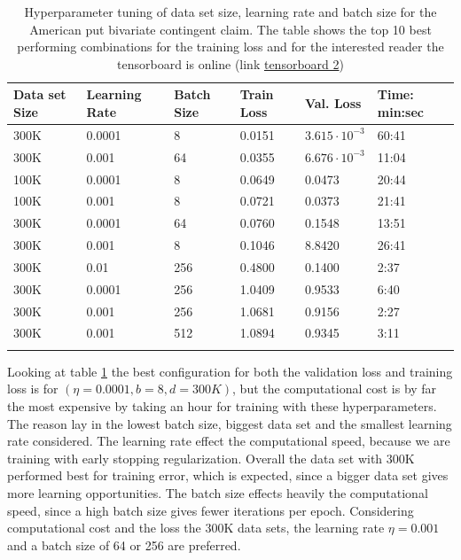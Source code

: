 \begin{table}[th]
\caption{Hyperparameter tuning of data set size, learning rate and batch size for the American put bivariate contingent claim. The table shows the top 10 best performing combinations for the training loss and for the interested reader the tensorboard is online (link \href{https://tensorboard.dev/experiment/mQWtOskJRoWrmrFgOIVQ4g/}{tensorboard 2})}
\label{tab:hyperAmerMin1}
\centering
\begin{tabular}{llllll}
\toprule
\textbf{Data set Size} & \textbf{Learning Rate} & \textbf{Batch Size} & \textbf{Train Loss} & \textbf{Val. Loss} & \textbf{Time: min:sec} \\
\midrule
300K    & 0.0001 & 8     & 0.0151 & $3.615\cdot 10^{-3}$ & 60:41\\ 
300K    & 0.001  & 64    & 0.0355 & $6.676\cdot 10^{-3}$ & 11:04\\ 
100K    & 0.0001 & 8     & 0.0649 & 0.0473 & 20:44\\ 
100K    & 0.001  & 8     & 0.0721 & 0.0373 & 21:41\\ 
300K    & 0.0001 & 64    & 0.0760 & 0.1548 & 13:51\\ 
300K    & 0.001  & 8     & 0.1046 & 8.8420 & 26:41\\ 
300K    & 0.01   & 256   & 0.4800 & 0.1400 & 2:37\\ 
300K    & 0.0001 & 256   & 1.0409 & 0.9533 & 6:40\\ 
300K    & 0.001  & 256   & 1.0681 & 0.9156 & 2:27 \\ 
300K    & 0.001  & 512   & 1.0894 & 0.9345 & 3:11 \\ 
\bottomrule\\
\end{tabular}
\end{table}

Looking at table \ref{tab:hyperAmerMin1} the best configuration for both the validation loss and training loss is for $(\eta=0.0001, b=8, d=300K)$, but the computational cost is by far the most expensive by taking an hour for training with these hyperparameters. The reason lay in the lowest batch size, biggest data set and the smallest learning rate considered. The learning rate effect the computational speed, because we are training with early stopping regularization. Overall the data set with 300K performed best for training error, which is expected, since a bigger data set gives more learning opportunities. The batch size effects heavily the computational speed, since a high batch size gives fewer iterations per epoch. Considering computational cost and the loss the 300K data sets, the learning rate $\eta=0.001$ and a batch size of 64 or 256 are preferred.\\

